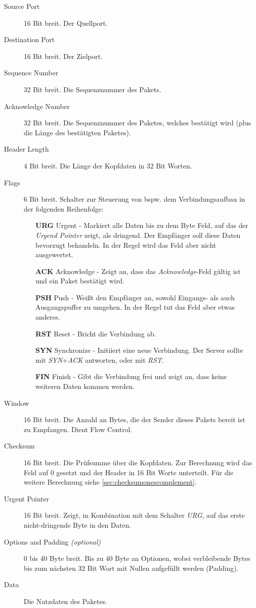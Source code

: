             \begin{description}
            	\item[Source Port] 16 Bit breit. Der Quellport.
            	\item[Destination Port] 16 Bit breit. Der Zielport.
            	\item[Sequence Number] 32 Bit breit. Die Sequenznummer des Pakets.
            	\item[Acknowledge Number] 32 Bit breit. Die Sequenznummer des Paketes, welches bestätigt wird (plus die Länge des bestätigten Paketes).
            	\item[Header Length] 4 Bit breit. Die Länge der Kopfdaten in 32 Bit Worten.
            	\item[Flags] 6 Bit breit. Schalter zur Steuerung von bspw. dem Verbindungsaufbau in der folgenden Reihenfolge:
	            	\begin{itemize}
	            		\item[\textbf{URG}] Urgent - Markiert alle Daten bis zu dem Byte Feld, auf das der \textit{Urgend Pointer} zeigt, als dringend. Der Empfänger soll diese Daten bevorzugt behandeln. In der Regel wird das Feld aber nicht ausgewertet.
	            		\item[\textbf{ACK}] Acknowledge - Zeigt an, dass das \textit{Acknowledge}-Feld gültig ist und ein Paket bestätigt wird.
	            		\item[\textbf{PSH}] Push - Weißt den Empfänger an, sowohl Eingangs- als auch Ausgangspuffer zu umgehen. In der Regel tut das Feld aber etwas anderes.
	            		\item[\textbf{RST}] Reset - Bricht die Verbindung ab.
	            		\item[\textbf{SYN}] Synchronize - Initiiert eine neue Verbindung. Der Server sollte mit \textit{SYN}+\textit{ACK} antworten, oder mit \textit{RST}.
	            		\item[\textbf{FIN}] Finish - Gibt die Verbindung frei und zeigt an, dass keine weiteren Daten kommen werden.
	            	\end{itemize}
            	\item[Window] 16 Bit breit. Die Anzahl an Bytes, die der Sender dieses Pakets bereit ist zu Empfangen. Dient Flow Control.
            	\item[Checksum] 16 Bit breit. Die Prüfsumme über die Kopfdaten. Zur Berechnung wird das Feld auf 0 gesetzt und der Header in 16 Bit Worte unterteilt. Für die weitere Berechnung siehe \ref{sec:checksumonescomplement}.
            	\item[Urgent Pointer] 16 Bit breit. Zeigt, in Kombination mit dem Schalter \textit{URG}, auf das erste nicht-dringende Byte in den Daten.
	        	\item[Options and Padding \textit{(optional)}] 0 bis 40 Byte breit. Bis zu 40 Byte an Optionen, wobei verbleibende Bytes bis zum nächsten 32 Bit Wort mit Nullen aufgefüllt werden (Padding).
            	\item[Data] Die Nutzdaten des Paketes.
            \end{description}


